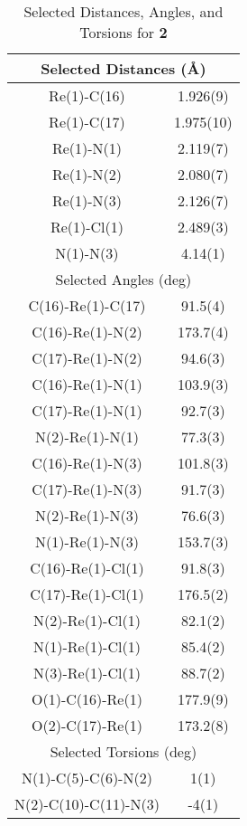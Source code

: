 \begin{table}[htbp]
  \caption{Selected Distances, Angles, and Torsions for \textbf{2}}
  \centering
    \begin{tabular}{cc}
    \toprule
    \multicolumn{2}{c}{Selected Distances (\r{A})} \\
    \midrule
    Re(1)-C(16) & 1.926(9) \\
    Re(1)-C(17) & 1.975(10) \\
    Re(1)-N(1) & 2.119(7) \\
    Re(1)-N(2) & 2.080(7) \\
    Re(1)-N(3) & 2.126(7) \\
    Re(1)-Cl(1) & 2.489(3) \\
    N(1)-N(3) & 4.14(1) \\ \midrule
    \multicolumn{2}{c}{Selected Angles (deg)} \\ \midrule
    C(16)-Re(1)-C(17) & 91.5(4) \\
    C(16)-Re(1)-N(2) & 173.7(4) \\
    C(17)-Re(1)-N(2) & 94.6(3) \\
    C(16)-Re(1)-N(1) & 103.9(3) \\
    C(17)-Re(1)-N(1) & 92.7(3) \\
    N(2)-Re(1)-N(1) & 77.3(3) \\
    C(16)-Re(1)-N(3) & 101.8(3) \\
    C(17)-Re(1)-N(3) & 91.7(3) \\
    N(2)-Re(1)-N(3) & 76.6(3) \\
    N(1)-Re(1)-N(3) & 153.7(3) \\
    C(16)-Re(1)-Cl(1) & 91.8(3) \\
    C(17)-Re(1)-Cl(1) & 176.5(2) \\
    N(2)-Re(1)-Cl(1) & 82.1(2) \\
    N(1)-Re(1)-Cl(1) & 85.4(2) \\
    N(3)-Re(1)-Cl(1) & 88.7(2) \\
    O(1)-C(16)-Re(1) & 177.9(9) \\
    O(2)-C(17)-Re(1) & 173.2(8) \\ \midrule
    \multicolumn{2}{c}{Selected Torsions (deg)} \\ \midrule
    N(1)-C(5)-C(6)-N(2) & 1(1) \\
    N(2)-C(10)-C(11)-N(3) & -4(1) \\
    \bottomrule
    \end{tabular}%
  \label{tab.da2}%
\end{table}%


